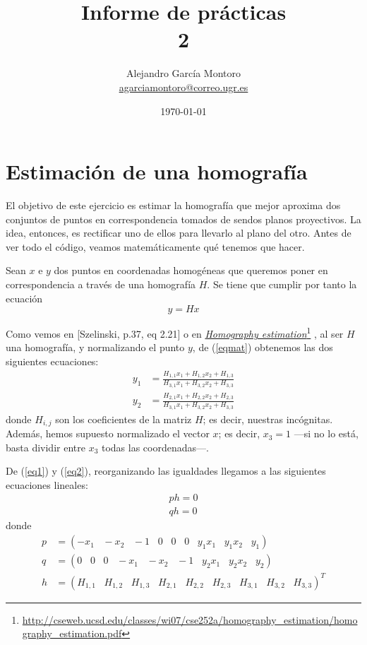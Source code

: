 \documentclass[a4paper, 11pt]{article}
\title{Informe de prácticas \\ 2}
\author{Alejandro García Montoro\\
    \href{mailto:agarciamontoro@correo.ugr.es}{agarciamontoro@correo.ugr.es}}
\date{\today}
\newcommand\fnurl[2]{%
  \href{#2}{#1}\footnote{\url{#2}}%
}
\theoremstyle{definition}
\theoremstyle{theorem}
\begin{document}
  \maketitle

  \section{Estimación de una homografía}
  El objetivo de este ejercicio es estimar la homografía que mejor aproxima dos conjuntos de puntos en correspondencia tomados de sendos planos proyectivos. La idea, entonces, es rectificar uno de ellos para llevarlo al plano del otro. Antes de ver todo el código, veamos matemáticamente qué tenemos que hacer.

  Sean $x$ e $y$ dos puntos en coordenadas homogéneas que queremos poner en correspondencia a través de una homografía $H$. Se tiene que cumplir por tanto la ecuación
  \begin{equation}
      y = Hx \label{eqmat}
  \end{equation}

  Como vemos en [Szelinski, p.37, eq 2.21] o en \fnurl{\emph{Homography estimation}}{http://cseweb.ucsd.edu/classes/wi07/cse252a/homography_estimation/homography_estimation.pdf}, al ser $H$ una homografía, y normalizando el punto $y$, de (\ref{eqmat}) obtenemos las dos siguientes ecuaciones:
  \begin{align}
      y_1 &= \frac{H_{1,1}x_1 + H_{1,2}x_2 + H_{1,3}}{H_{3,1}x_1 + H_{3,2}x_2 + H_{3,3}} \label{eq1}\\
      y_2 &= \frac{H_{2,1}x_1 + H_{2,2}x_2 + H_{2,3}}{H_{3,1}x_1 + H_{3,2}x_2 + H_{3,3}} \label{eq2}
  \end{align}
  donde $H_{i,j}$ son los coeficientes de la matriz $H$; es decir, nuestras incógnitas. Además, hemos supuesto normalizado el vector $x$; es decir, $x_3=1$ ---si no lo está, basta dividir entre $x_3$ todas las coordenadas---.

  De (\ref{eq1}) y (\ref{eq2}), reorganizando las igualdades llegamos a las siguientes ecuaciones lineales:
  \begin{align}
      ph = 0 \label{lineal1}\\
      qh = 0 \label{lineal2}
  \end{align}
  donde
  \begin{align*}
      p &= (-x_1 \;\;\; -x_2 \;\;\; -1 \;\;\; 0 \;\;\; 0 \;\;\; 0 \;\;\; y_1x_1 \;\;\; y_1x_2 \;\;\; y_1) \\
      q &= (0 \;\;\; 0 \;\;\; 0 \;\;\; -x_1 \;\;\; -x_2 \;\;\; -1 \;\;\; y_2x_1 \;\;\; y_2x_2 \;\;\; y_2) \\
      h &= (H_{1,1} \;\;\; H_{1,2} \;\;\; H_{1,3} \;\;\; H_{2,1} \;\;\; H_{2,2} \;\;\; H_{2,3} \;\;\; H_{3,1} \;\;\; H_{3,2} \;\;\; H_{3,3})^T
  \end{align*}
\end{document}
